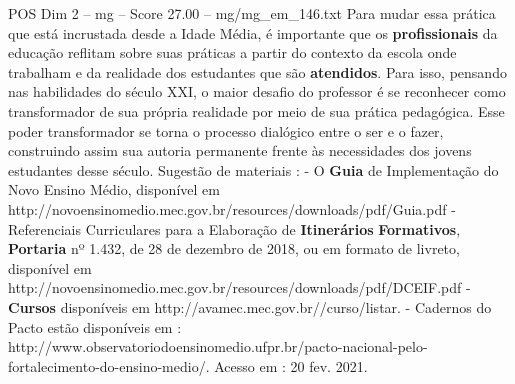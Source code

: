 \begin{textsample}{POS Dim 2 – mg – Score 27.00 – mg/mg\_em\_146.txt}
Para mudar essa prática que está incrustada desde a Idade Média, é importante que os \textbf{profissionais} da educação reflitam sobre suas práticas a partir do contexto da escola onde trabalham e da realidade dos estudantes que são \textbf{atendidos}.
Para isso, pensando nas habilidades do século XXI, o maior desafio do professor é se reconhecer como transformador de sua própria realidade por meio de sua prática pedagógica.
Esse poder transformador se torna o processo dialógico entre o ser e o fazer, construindo assim sua autoria permanente frente às necessidades dos jovens estudantes desse século.
Sugestão de materiais : - O \textbf{Guia} de Implementação do Novo Ensino Médio, disponível em http://novoensinomedio.mec.gov.br/resources/downloads/pdf/Guia.pdf - Referenciais Curriculares para a Elaboração de \textbf{Itinerários} \textbf{Formativos}, \textbf{Portaria} nº 1.432, de 28 de dezembro de 2018, ou em formato de livreto, disponível em http://novoensinomedio.mec.gov.br/resources/downloads/pdf/DCEIF.pdf - \textbf{Cursos} disponíveis em http://avamec.mec.gov.br//curso/listar. - Cadernos do Pacto estão disponíveis em : http://www.observatoriodoensinomedio.ufpr.br/pacto-nacional-pelo-fortalecimento-do-ensino-medio/.
Acesso em : 20 fev. 2021.

\end{textsample}
